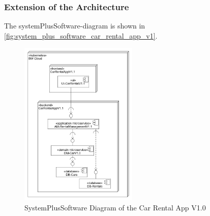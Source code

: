 \subsubsection*{Extension of the Architecture}
The systemPlusSoftware-diagram is shown in \autoref{fig:system_plus_software_car_rental_app_v1}.

\begin{figure}
    \centering
    \includegraphics[width=0.5\textwidth]{figures/microservices/introduction/ms_intro_spsdCarRentalV1.png}
    \caption{SystemPlusSoftware Diagram of the Car Rental App V1.0}
    \label{fig:system_plus_software_car_rental_app_v1}
\end{figure}
